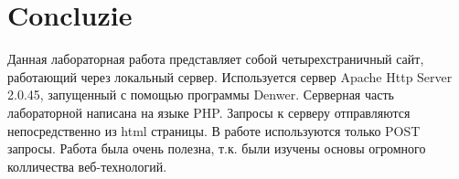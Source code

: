 \section*{Concluzie}
{}
Данная лабораторная работа представляет собой четырехстраничный сайт, работающий через локальный сервер. Используется сервер Apache Http Server 2.0.45, запущенный с помощью программы Denwer. Серверная часть лабораторной написана на языке PHP. Запросы к серверу отправляются  непосредственно из html страницы. В работе используются только POST запросы. Работа была очень полезна, т.к. были изучены основы огромного колличества веб-технологий. 

\clearpage